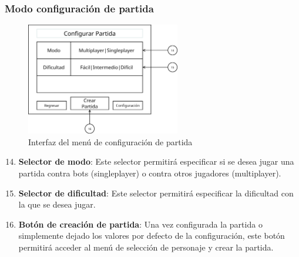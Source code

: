 \subsubsection{Modo configuración de partida}
\begin{figure}[H]
    \centering
    \includegraphics[width=0.6\textwidth]{5-Cuerpo/Chapter5/5.5/I4.png} %
    \caption{Interfaz del menú de configuración de partida}
    \label{fig:Interface_Configuracion_Partida}
\end{figure}
\begin{enumerate}\setcounter{enumi}{13}
    \item \textbf{Selector de modo}: Este selector permitirá especificar si se
    desea jugar una partida contra bots (singleplayer) o contra otros jugadores
    (multiplayer).
    \item \textbf{Selector de dificultad}: Este selector permitirá especificar
    la dificultad con la que se desea jugar.
    \item \textbf{Botón de creación de partida}: Una vez configurada la partida
    o simplemente dejado los valores por defecto de la configuración, este botón
    permitirá acceder al menú de selección de personaje y crear la partida.
\end{enumerate}

